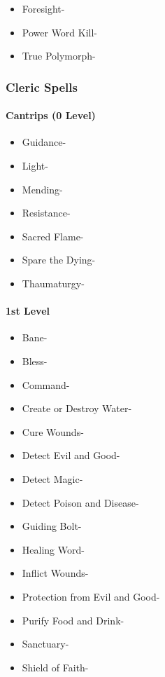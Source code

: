\documentclass[
]{article}
\providecommand{\tightlist}{%
  \setlength{\itemsep}{0pt}\setlength{\parskip}{0pt}}
\begin{document}
\begin{itemize}
\tightlist
\item
  Foresight-
\item
  Power Word Kill-
\item
  True Polymorph-
\end{itemize}

\hypertarget{cleric-spells}{%
\subsubsection{Cleric Spells}\label{cleric-spells}}

\hypertarget{cantrips-0-level-1}{%
\paragraph{Cantrips (0 Level)}\label{cantrips-0-level-1}}

\begin{itemize}
\tightlist
\item
  Guidance-
\item
  Light-
\item
  Mending-
\item
  Resistance-
\item
  Sacred Flame-
\item
  Spare the Dying-
\item
  Thaumaturgy-
\end{itemize}

\hypertarget{1st-level-1}{%
\paragraph{1st Level}\label{1st-level-1}}

\begin{itemize}
\tightlist
\item
  Bane-
\item
  Bless-
\item
  Command-
\item
  Create or Destroy Water-
\item
  Cure Wounds-
\item
  Detect Evil and Good-
\item
  Detect Magic-
\item
  Detect Poison and Disease-
\item
  Guiding Bolt-
\item
  Healing Word-
\item
  Inflict Wounds-
\item
  Protection from Evil and Good-
\item
  Purify Food and Drink-
\item
  Sanctuary-
\item
  Shield of Faith-
\end{itemize}
\end{document}
